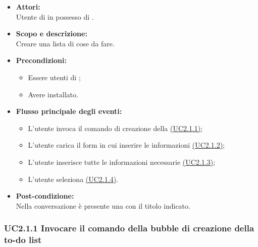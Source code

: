 \begin{itemize}
	\item \textbf{Attori:}
	\\Utente di  in possesso di \ProjectName{}.
	\item \textbf{Scopo e descrizione:} 
	\\Creare una lista di cose da fare.
	\item \textbf{Precondizioni:}
	\begin{itemize}
		\item Essere utenti di ;
		\item Avere \ProjectName installato.
	\end{itemize}
	\item \textbf{Flusso principale degli eventi:}
	\begin{itemize}
		\item L'utente invoca il comando di creazione della   \hyperref[UC2.1.1]{(UC2.1.1)};
		\item L'utente carica il form in cui inserire le informazioni \hyperref[UC2.1.2]{(UC2.1.2)};
		\item L'utente inserisce tutte le informazioni necessarie \hyperref[UC2.1.3]{(UC2.1.3)};
		\item L'utente seleziona  \hyperref[UC2.1.4]{(UC2.1.4)}.
	\end{itemize}
	\item \textbf{Post-condizione:}
	\\Nella conversazione è presente una   con il titolo indicato.
\end{itemize}

\subsubsection{UC2.1.1 Invocare il comando della bubble di creazione della to-do list} \label{UC2.1.1}

